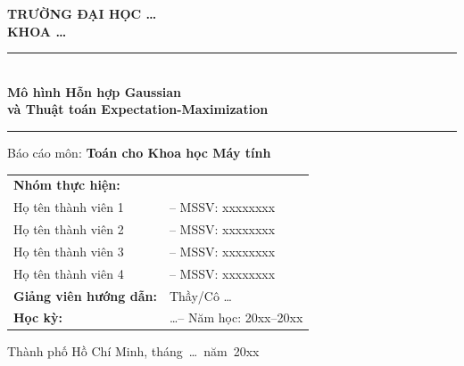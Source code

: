 \documentclass[12pt, a4paper]{article}
\begin{document}

\begin{titlepage}
  \centering
  \vspace*{1cm}

  {\Large\bfseries TRƯỜNG ĐẠI HỌC \ldots\\[4pt]
   KHOA \ldots}

  \vspace{1.5cm}
  \rule{\linewidth}{1.5pt}\\[6pt]
  {\LARGE\bfseries Mô hình Hỗn hợp Gaussian\\[6pt]
   và Thuật toán Expectation-Maximization}\\[6pt]
  \rule{\linewidth}{1.5pt}

  \vspace{1cm}
  {\large Báo cáo môn: \textbf{Toán cho Khoa học Máy tính}}

  \vspace{2cm}
  \begin{tabular}{ll}
    \textbf{Nhóm thực hiện:} & \\[4pt]
    \quad Họ tên thành viên 1 & -- MSSV: xxxxxxxx \\
    \quad Họ tên thành viên 2 & -- MSSV: xxxxxxxx \\
    \quad Họ tên thành viên 3 & -- MSSV: xxxxxxxx \\
    \quad Họ tên thành viên 4 & -- MSSV: xxxxxxxx \\[8pt]
    \textbf{Giảng viên hướng dẫn:} & Thầy/Cô \ldots \\[8pt]
    \textbf{Học kỳ:}  & \ldots -- Năm học: 20xx--20xx \\
  \end{tabular}

  \vfill
  {\large Thành phố Hồ Chí Minh, tháng~\ldots~năm~20xx}
\end{titlepage}

\begin{abstract}
  \noindent
  Báo cáo này trình bày lý thuyết và ứng dụng của Mô hình Hỗn hợp Gaussian
  (Gaussian Mixture Model – GMM) và thuật toán Expectation-Maximization (EM).
  Chúng tôi bắt đầu từ nền tảng toán học cần thiết, xây dựng mô hình GMM,
  suy dẫn đầy đủ các bước E-step và M-step, phân tích tính hội tụ, rồi so sánh
  GMM với phương pháp phân cụm $k$-means.
  Phần thực nghiệm minh họa hoạt động của thuật toán trên các bộ dữ liệu tổng hợp
  và thực tế, kèm theo phân tích định lượng.

  \medskip\noindent
  \textbf{Từ khóa:} Mô hình hỗn hợp Gaussian, Thuật toán EM,
  Phân cụm mềm, Biến ẩn, Hội tụ log-likelihood.
\end{abstract}
\end{document}
